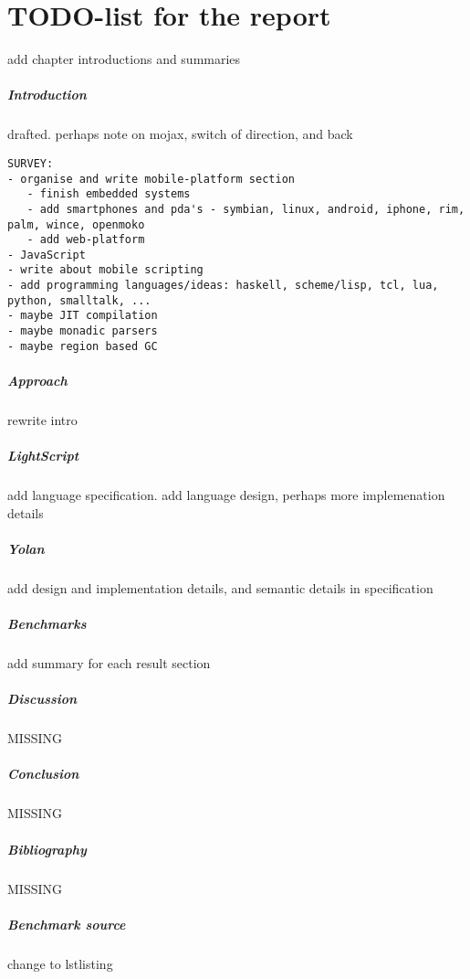 \documentclass[11pt]{report}
\begin{document}
\chapter*{TODO-list for the report}
{\scriptsize
add chapter introductions and summaries
\paragraph{Introduction}
drafted. perhaps note on mojax, switch of direction, and back
\begin{verbatim}
SURVEY:
- organise and write mobile-platform section
   - finish embedded systems
   - add smartphones and pda's - symbian, linux, android, iphone, rim, palm, wince, openmoko
   - add web-platform
- JavaScript
- write about mobile scripting
- add programming languages/ideas: haskell, scheme/lisp, tcl, lua, python, smalltalk, ...
- maybe JIT compilation
- maybe monadic parsers
- maybe region based GC
\end{verbatim}
\paragraph{Approach}
rewrite intro
\paragraph{LightScript}
add language specification. add language design, perhaps more implemenation details
\paragraph{Yolan}
add design and implementation details, and semantic details in specification
\paragraph{Benchmarks}
add summary for each result section
\paragraph{Discussion}
MISSING
\paragraph{Conclusion}
MISSING
\paragraph{Bibliography}
MISSING
\paragraph{Benchmark source}
change to lstlisting
}
\end{document}
